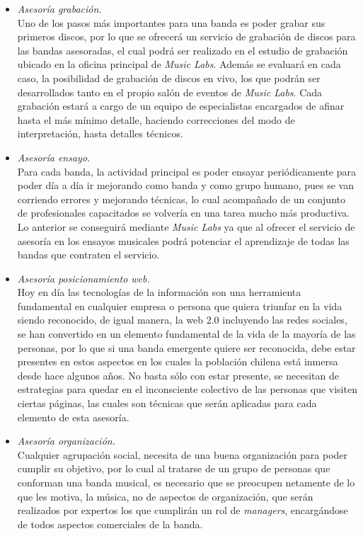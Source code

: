 \begin{itemize}
	\item \textit{Asesoría grabación.}\\

		Uno de los pasos más importantes para una banda
		es poder grabar sus primeros discos, por lo que
		se ofrecerá un servicio de grabación de discos para las bandas asesoradas,
		el cual podrá ser realizado en el estudio de grabación ubicado en la oficina
		principal de \emph{Music Labs}.
		Además se evaluará en cada caso, la posibilidad de grabación de discos
		en vivo, los que podrán ser desarrollados tanto en el propio salón de eventos
		de \emph{Music Labs}.
		Cada grabación estará a cargo de un equipo de especialistas encargados
		de afinar hasta el más mínimo detalle, haciendo correcciones del modo
		de interpretación, hasta detalles técnicos.
	\item \textit{Asesoría ensayo.}\\

		Para cada banda, la actividad principal es poder ensayar periódicamente
		para poder día a día ir mejorando como banda y como grupo humano,
		pues se van corriendo errores y mejorando técnicas,
		lo cual acompañado de un conjunto de profesionales capacitados
		se volvería en una tarea mucho más productiva.
		Lo anterior se conseguirá mediante \emph{Music Labs} ya que
		al ofrecer el servicio de asesoría en los ensayos musicales
		podrá potenciar el aprendizaje de todas las bandas que
		contraten el servicio.
		
	\item \textit{Asesoría posicionamiento web.}\\

		Hoy en día las tecnologías de la información son una herramienta
		fundamental en cualquier empresa o persona que quiera triunfar
		en la vida siendo reconocido, de igual manera, la web 2.0
		incluyendo las redes sociales, se han convertido en un elemento
		fundamental de la vida de la mayoría de las personas, por lo que
		si una banda emergente quiere ser reconocida, debe estar presentes
		en estos aspectos en los cuales la población chilena está
		inmersa desde hace algunos años.
		No basta sólo con estar presente, se necesitan de estrategias
		para quedar en el inconsciente colectivo de las personas
		que visiten ciertas páginas, las cuales son técnicas que serán
		aplicadas para cada elemento de esta asesoría.
	\item \textit{Asesoría organización.}\\

		Cualquier agrupación social, necesita de una buena organización
		para poder cumplir su objetivo, por lo cual al tratarse de un
		grupo de personas que conforman una banda musical, es necesario
		que se preocupen netamente de lo que les motiva, la música,
		no de aspectos de organización, que serán realizados por expertos
		los que cumplirán un rol de \emph{managers}, encargándose
		de todos aspectos comerciales de la banda. 
\end{itemize}


